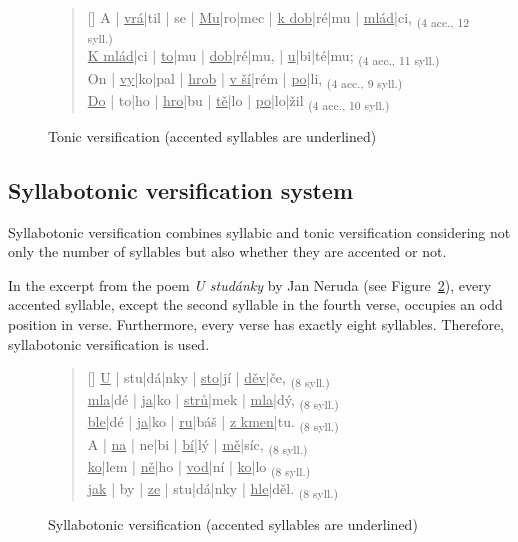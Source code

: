 \begin{figure}[htpb]
    \centering
    \begin{verse}[\versewidth]
    A | \uline{vrá}|til | se | \uline{Mu}|ro|mec | \uline{k dob}|ré|mu | \uline{mlád}|ci, \textsubscript{(4 acc., 12 syll.)}\\
    \uline{K mlád}|ci | \uline{to}|mu | \uline{dob}|ré|mu, | \uline{u}|bi|té|mu; \textsubscript{(4 acc., 11 syll.)}\\
    On | \uline{vy}|ko|pal | \uline{hrob} | \uline{v ší}|rém | \uline{po}|li, \textsubscript{(4 acc., 9 syll.)}\\
    \uline{Do} | to|ho | \uline{hro}|bu | \uline{tě}|lo | \uline{po}|lo|žil \textsubscript{(4 acc., 10 syll.)}\\
    \end{verse}
    \caption[Tonic versification]{Tonic versification (accented syllables are underlined)}\label{fig:tonic-versification}
\end{figure}

\subsection{Syllabotonic versification system}
Syllabotonic versification combines syllabic and tonic versification considering not only the number of syllables but also whether they are accented or not.~\cite{UvodTeorieVerse}

In the excerpt from the poem \emph{U studánky} by Jan Neruda (see Figure~\ref{fig:syllabotonic-versification}), every accented syllable, except the second syllable in the fourth verse, occupies an odd position in verse. Furthermore, every verse has exactly eight syllables. Therefore, syllabotonic versification is used.~\cite{TeorieLiteraturySS}

\begin{figure}[htpb]
    \centering
    \begin{verse}[\versewidth]
    \uline{U} | stu|dá|nky | \uline{sto}|jí | \uline{děv}|če, \textsubscript{(8 syll.)}\\
    \uline{mla}|dé | \uline{ja}|ko | \uline{strů}|mek | \uline{mla}|dý, \textsubscript{(8 syll.)}\\
    \uline{ble}|dé | \uline{ja}|ko | \uline{ru}|báš | \uline{z kmen}|tu. \textsubscript{(8 syll.)}\\
    A | \uline{na} | ne|bi | \uline{bí}|lý | \uline{mě}|síc, \textsubscript{(8 syll.)}\\
    \uline{ko}|lem | \uline{ně}|ho | \uline{vod}|ní | \uline{ko}|lo \textsubscript{(8 syll.)}\\
    \uline{jak} | by | \uline{ze} | stu|dá|nky | \uline{hle}|děl. \textsubscript{(8 syll.)}\\
    \end{verse}
    \caption[Syllabotonic versification]{Syllabotonic versification (accented syllables are underlined)}\label{fig:syllabotonic-versification}
\end{figure}

